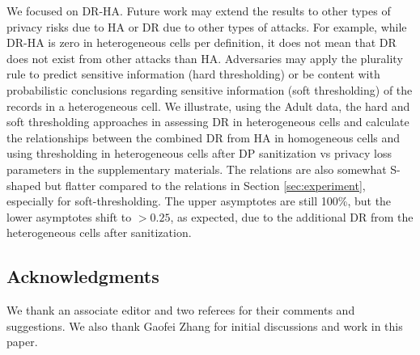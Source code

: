 \documentclass[10pt,journal,compsoc]{IEEEtran}
\begin{document}
We focused on DR-HA.  Future work may extend the results to other types of privacy risks due to HA or DR due to other types of attacks.  For example, while  DR-HA is zero in heterogeneous cells  per definition, it does not mean that DR does not exist from other attacks than HA. Adversaries may apply the plurality rule to predict sensitive information  (hard thresholding) or  be content with  probabilistic conclusions regarding sensitive information  (soft thresholding) of the records in a heterogeneous cell.   We illustrate, using the Adult data, the hard and soft thresholding approaches in assessing DR in heterogeneous cells and calculate the relationships between the combined DR from HA in homogeneous cells and using thresholding in heterogeneous cells after DP sanitization vs privacy loss parameters in the supplementary materials. The relations are also somewhat S-shaped but flatter compared to the relations in Section \ref{sec:experiment}, especially for soft-thresholding. The upper asymptotes are still 100\%, but the lower asymptotes shift to $>0.25$, as expected, due to the additional DR from the heterogeneous cells after sanitization.  


\vspace{-12pt} 
\subsection*{Acknowledgments}\vspace{-4pt} 
\small We thank an associate editor and two referees for their comments and suggestions. We also thank Gaofei Zhang for initial discussions and work in this paper.

\normalsize
\vspace{-12pt}


\end{document}
